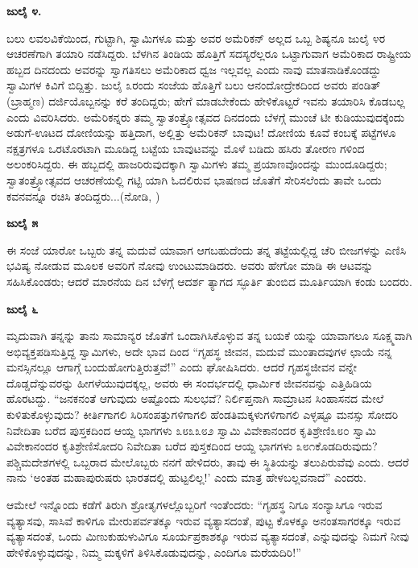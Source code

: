 \textbf{ಜುಲೈ ೪.}

ಬಲು ಲವಲವಿಕೆಯಿಂದ, ಗುಟ್ಟಾಗಿ, ಸ್ವಾಮಿಗಳೂ ಮತ್ತು ಅವರ ಅಮೆರಿಕನ್ ಅಲ್ಲದ ಒಬ್ಬ ಶಿಷ್ಯನೂ ಜುಲೈ ೪ರ ಆಚರಣೆಗಾಗಿ ತಯಾರಿ ನಡೆಸಿದ್ದರು. ಬೆಳಗಿನ ತಿಂಡಿಯ ಹೊತ್ತಿಗೆ ಸದಸ್ಯರೆಲ್ಲರೂ ಒಟ್ಟಾಗುವಾಗ ಅಮೆರಿಕಾದ ರಾಷ್ಟ್ರೀಯ ಹಬ್ಬದ ದಿನದಂದು ಅವರನ್ನು ಸ್ವಾಗತಿಸಲು ಅಮೆರಿಕಾದ ಧ್ವಜ ಇಲ್ಲವಲ್ಲ ಎಂದು ನಾವು ಮಾತನಾಡಿಕೊಂಡದ್ದು ಸ್ವಾಮಿಗಳ ಕಿವಿಗೆ ಬಿದ್ದಿತ್ತು. ಜುಲೈ ೩ರಂದು ಸಂಜೆಯ ಹೊತ್ತಿಗೆ ಬಲು ಆನಂದೋದ್ರೇಕದಿಂದ ಅವರು ಪಂಡಿತ್ (ಬ್ರಾಹ್ಮಣ) ದರ್ಜಿಯೊಬ್ಬನನ್ನು ಕರೆ ತಂದಿದ್ದರು; ಹೇಗೆ ಮಾಡಬೇಕೆಂದು ಹೇಳಿಕೊಟ್ಟರೆ ಇವನು ತಯಾರಿಸಿ ಕೊಡಬಲ್ಲ ಎಂದು ವಿವರಿಸಿದರು. ಅಮೆರಿಕನ್ನರು ತಮ್ಮ ಸ್ವಾತಂತ್ರ್ಯೋತ್ಸವದ ದಿನದಂದು ಬೆಳಗ್ಗೆ ಮುಂಚೆ ಟೀ ಕುಡಿಯುವುದಕ್ಕೆಂದು ಅಡುಗೆ-ಊಟದ ದೋಣಿಯನ್ನು ಹತ್ತಿದಾಗ, ಅಲ್ಲಿತ್ತು ಅಮೆರಿಕನ್ ಬಾವುಟ! ದೋಣಿಯ ಕೂವೆ ಕಂಬಕ್ಕೆ ಪಟ್ಟೆಗಳೂ ನಕ್ಷತ್ರಗಳೂ ಒರಟೊರಟಾಗಿ ಮೂಡಿದ್ದ ಬಟ್ಟೆಯ ಬಾವುಟವನ್ನು ಮೊಳೆ ಬಡಿದು ಹಸಿರು ತೋರಣ ಗಳಿಂದ ಅಲಂಕರಿಸಿದ್ದರು. ಈ ಹಬ್ಬದಲ್ಲಿ ಹಾಜರಿರುವುದಕ್ಕಾಗಿ ಸ್ವಾಮಿಗಳು ತಮ್ಮ ಪ್ರಯಾಣವೊಂದನ್ನು ಮುಂದೂಡಿದ್ದರು; ಸ್ವಾತಂತ್ರ್ಯೋತ್ಸವದ ಆಚರಣೆಯಲ್ಲಿ ಗಟ್ಟಿ ಯಾಗಿ ಓದಲಿರುವ ಭಾಷಣದ ಜೊತೆಗೆ ಸೇರಿಸಲೆಂದು ತಾವೇ ಒಂದು ಕವನವನ್ನೂ ರಚಿಸಿ ತಂದಿದ್ದರು...(ನೋಡಿ, )

\textbf{ಜುಲೈ ೫}

ಈ ಸಂಜೆ ಯಾರೋ ಒಬ್ಬರು ತನ್ನ ಮದುವೆ ಯಾವಾಗ ಆಗಬಹುದೆಂದು ತನ್ನ ತಟ್ಟೆಯಲ್ಲಿದ್ದ ಚೆರಿ ಬೀಜಗಳನ್ನು ಎಣಿಸಿ ಭವಿಷ್ಯ ನೋಡುವ ಮೂಲಕ ಅವರಿಗೆ ನೋವು ಉಂಟುಮಾಡಿದರು. ಅವರು ಹೇಗೋ ಮಾಡಿ ಈ ಆಟವನ್ನು ಸಹಿಸಿಕೊಂಡರು; ಆದರೆ ಮಾರನೆಯ ದಿನ ಬೆಳಗ್ಗೆ ಆದರ್ಶ ತ್ಯಾಗದ ಸ್ಫೂರ್ತಿ ತುಂಬಿದ ಮೂರ್ತಿಯಾಗಿ ಕಂಡು ಬಂದರು.

\textbf{ಜುಲೈ ೬}

ಮೃದುವಾಗಿ ತನ್ನನ್ನು ತಾನು ಸಾಮಾನ್ಯರ ಜೊತೆಗೆ ಒಂದಾಗಿಸಿಕೊಳ್ಳುವ ತನ್ನ ಬಯಕೆ ಯನ್ನು ಯಾವಾಗಲೂ ಸೂಕ್ಷ್ಮವಾಗಿ ಅಭಿವ್ಯಕ್ತಪಡಿಸುತ್ತಿದ್ದ ಸ್ವಾಮಿಗಳು, ಅದೇ ಭಾವ ದಿಂದ “ಗೃಹಸ್ಥ ಜೀವನ, ಮದುವೆ ಮುಂತಾದವುಗಳ ಛಾಯೆ ನನ್ನ ಮನಸ್ಸಿನಲ್ಲೂ ಆಗಾಗ್ಗೆ ಬಂದುಹೋಗುತ್ತಿರುತ್ತವೆ!” ಎಂದು ಘೋಷಿಸಿದರು. ಆದರೆ ಗೃಹಸ್ಥಜೀವನ ವನ್ನೇ ದೊಡ್ಡದೆನ್ನುವರನ್ನು ಹೀಗಳೆಯುವುದಕ್ಕಲ್ಲ, ಅವರು ಈ ಸಂದರ್ಭದಲ್ಲಿ ಧಾರ್ಮಿಕ ಜೀವನವನ್ನು ಎತ್ತಿಹಿಡಿಯ ಹೊರಟದ್ದು. “ಜನಕನಂತೆ ಆಗುವುದು ಅಷ್ಟೊಂದು ಸುಲಭವೆ? ನಿರ್ಲಿಪ್ತನಾಗಿ ಸಾಮ್ರಾಟನ ಸಿಂಹಾಸನದ ಮೇಲೆ ಕುಳಿತುಕೊಳ್ಳುವುದು? ಕೀರ್ತಿಗಾಗಲಿ ಸಿರಿಸಂಪತ್ತುಗಳಿಗಾಗಲಿ ಹೆಂಡತಿಮಕ್ಕಳುಗಳಿಗಾಗಲಿ ಎಳ್ಳಷ್ಟೂ ಮನಸ್ಸು ಸೋದರಿ ನಿವೇದಿತಾ ಬರೆದ ಪುಸ್ತಕದಿಂದ ಆಯ್ದ ಭಾಗಗಳು ೩೮೩೩೮೨ ಸ್ವಾಮಿ ವಿವೇಕಾನಂದರ ಕೃತಿಶ್ರೇಣಿ೩೮೦ ಸ್ವಾಮಿ ವಿವೇಕಾನಂದರ ಕೃತಿಶ್ರೇಣಿಸೋದರಿ ನಿವೇದಿತಾ ಬರೆದ ಪುಸ್ತಕದಿಂದ ಆಯ್ದ ಭಾಗಗಳು ೩೮೧ಕೊಡದಿರುವುದು? ಪಶ್ಚಿಮದೇಶಗಳಲ್ಲಿ ಒಬ್ಬರಾದ ಮೇಲೊಬ್ಬರು ನನಗೆ ಹೇಳಿದರು, ತಾವು ಈ ಸ್ಥಿತಿಯನ್ನು ತಲುಪಿರುವೆವು ಎಂದು. ಆದರೆ ನಾನು ‘ಅಂತಹ ಮಹಾಪುರುಷರು ಭಾರತದಲ್ಲಿ ಹುಟ್ಟಲಿಲ್ಲ!’ ಎಂದು ಮಾತ್ರ ಹೇಳಬಲ್ಲವನಾದೆ” ಎಂದರು.

ಆಮೇಲೆ ಇನ್ನೊಂದು ಕಡೆಗೆ ತಿರುಗಿ ಶ್ರೋತೃಗಳಲ್ಲೊಬ್ಬರಿಗೆ ಇಂತೆಂದರು: “ಗೃಹಸ್ಥ ನಿಗೂ ಸಂನ್ಯಾಸಿಗೂ ಇರುವ ವ್ಯತ್ಯಾಸವು, ಸಾಸಿವೆ ಕಾಳಿಗೂ ಮೇರುಪರ್ವತಕ್ಕೂ ಇರುವ ವ್ಯತ್ಯಾಸದಂತೆ, ಪುಟ್ಟ ಕೊಳಕ್ಕೂ ಅನಂತಸಾಗರಕ್ಕೂ ಇರುವ ವ್ಯತ್ಯಾಸದಂತೆ, ಒಂದು ಮಿಣುಕುಹುಳುವಿಗೂ ಸೂರ್ಯಪ್ರಕಾಶಕ್ಕೂ ಇರುವ ವ್ಯತ್ಯಾಸದಂತೆ, ಎನ್ನುವುದನ್ನು ನಿಮಗೆ ನೀವು ಹೇಳಿಕೊಳ್ಳುವುದನ್ನು, ನಿಮ್ಮ ಮಕ್ಕಳಿಗೆ ತಿಳಿಸಿಕೊಡುವುದನ್ನು, ಎಂದಿಗೂ ಮರೆಯದಿರಿ!”

